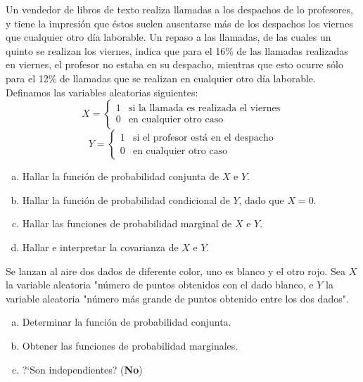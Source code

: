 \documentclass[12pt]{article}
\begin{document}
\begin{prob}
    Un vendedor de libros  de texto realiza llamadas  a los despachos de
    lo profesores, y tiene la impresión que éstos suelen ausentarse
    más de los despachos los viernes  que cualquier otro día
    laborable. Un repaso a las llamadas, de las cuales un quinto se
    realizan los viernes, indica que  para el 16\% de las llamadas
    realizadas en viernes, el profesor no estaba en su despacho, mientras
    que esto ocurre sólo  para el 12\% de llamadas que se realizan en
    cualquier otro día laborable. Definamos las variables aleatorias
    siguientes:
    $$X=\left\{\begin{array}{ll}
    1 & \mbox{si la llamada es realizada el viernes}\\
    0 & \mbox{en cualquier otro caso}
    \end{array}\right.
    $$
    $$Y=\left\{\begin{array}{ll}
    1 & \mbox{si  el profesor está en el despacho}\\
    0 & \mbox{en cualquier otro caso}
    \end{array}\right.
    $$
    \begin{enumerate}[a)]
    \item Hallar la función de probabilidad conjunta de $X$ e $Y$.
    \item Hallar la función de probabilidad condicional de $Y$, dado
    que $X=0$.
    \item Hallar las funciones de probabilidad marginal de $X$ e $Y$.
    \item Hallar e interpretar la covarianza de $X$ e $Y$.
    \end{enumerate}
    \end{prob}


    \begin{prob} Se lanzan al aire dos dados de diferente color, uno es blanco y el otro rojo.
     Sea $X$ la variable aleatoria "número de puntos obtenidos con el dado blanco, e $Y$
     la variable aleatoria "número más grande de puntos obtenido entre los dos dados".
\begin{enumerate}[a)]
\item Determinar la función de probabilidad conjunta.
\item Obtener las funciones de probabilidad marginales.
\item ?`Son independientes? (\textbf{No})
\end{enumerate}

\end{prob}
\end{document}
